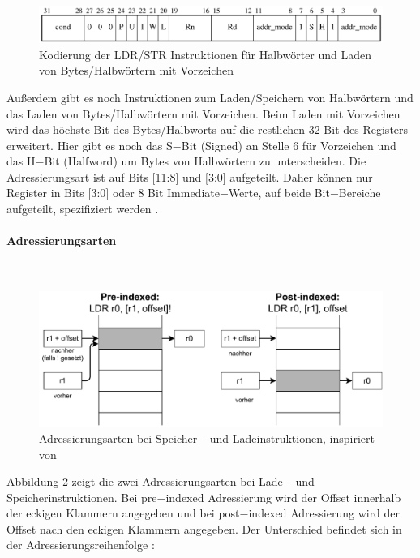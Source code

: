 \documentclass[a4paper, 11pt, onecolumn]{article}
\begin{document}
\begin{figure}[!htb]
\centering
\includegraphics[width=1\textwidth]{data/ldrstrh}
\caption{Kodierung der LDR/STR Instruktionen für Halbwörter und Laden von Bytes/Halbwörtern mit Vorzeichen \cite{arm:2005}}
\label{fig:ldrstrh}
\end{figure}

Außerdem gibt es noch Instruktionen zum Laden/Speichern von Halbwörtern und das Laden von Bytes/Halbwörtern mit Vorzeichen. Beim Laden mit Vorzeichen wird das höchste Bit des Bytes/Halbworts auf die restlichen 32 Bit des Registers erweitert. Hier gibt es noch das S$-$Bit (Signed) an Stelle 6 für Vorzeichen und das H$-$Bit (Halfword) um Bytes von Halbwörtern zu unterscheiden. Die Adressierungsart ist auf Bits $[$11:8$]$ und $[$3:0$]$ aufgeteilt. Daher können nur Register in Bits $[$3:0$]$ oder 8 Bit Immediate$-$Werte, auf beide Bit$-$Bereiche aufgeteilt, spezifiziert werden \cite{arm:2005}.

\paragraph{Adressierungsarten}\label{sec:ldrstraddr}
~\\
\begin{figure}[!htb]
\centering
\includegraphics[width=1\textwidth]{data/offset}
\caption{Adressierungsarten bei Speicher$-$ und Ladeinstruktionen, inspiriert von \cite{assembly}}
\label{fig:offset}
\end{figure}

Abbildung \ref{fig:offset} zeigt die zwei Adressierungsarten bei Lade$-$ und Speicherinstruktionen. Bei pre$-$indexed Adressierung wird der Offset innerhalb der eckigen Klammern angegeben und bei post$-$indexed Adressierung wird der Offset nach den eckigen Klammern angegeben. Der Unterschied befindet sich in der Adressierungsreihenfolge \cite{arm:2005}:
\end{document}
